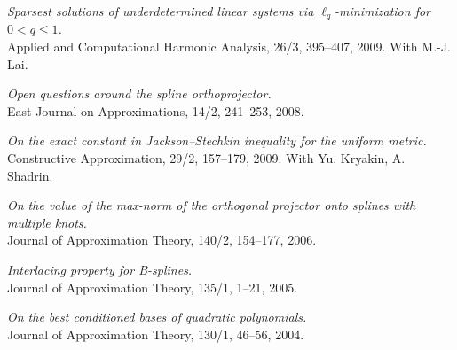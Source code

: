 \documentclass[11pt]{article}
\begin{document}
\item {\sl  Sparsest solutions of underdetermined linear systems via $\ell_q$-minimization for $0 <  q  \le  1$.}\\
Applied and Computational Harmonic Analysis, 26/3, 395--407, 2009. 
With M.-J. Lai.
\item {\sl Open questions around the spline orthoprojector.}\\
East Journal on Approximations, 14/2, 241--253, 2008.
\item {\sl On the exact constant in Jackson--Stechkin inequality for the uniform metric.}\\
Constructive Approximation, 29/2, 157--179, 2009. 
With Yu. Kryakin, A. Shadrin.
\item {\sl On the value of the max-norm of the orthogonal projector onto splines with multiple knots.}\\
Journal of Approximation Theory, 140/2, 154--177, 2006.
\item {\sl  Interlacing property for B-splines.}\\
Journal of Approximation Theory, 135/1, 1--21, 2005.
\item {\sl On the best conditioned bases of quadratic polynomials.}\\
Journal of Approximation Theory, 130/1, 46--56, 2004.
\eetaremune
	
\end{document}
